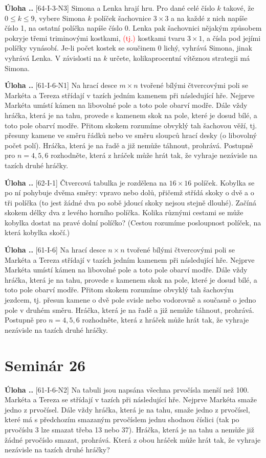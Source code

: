 \documentclass{article}
\newcounter{seminar}
\newcounter{problem}
\newcommand{\seminar}[1]{
  \clearpage
  \setcounter{seminar}{#1}
  \setcounter{problem}{0}
  \section*{Seminár #1}
}
\newcommand\todo[1]{\noindent\textcolor{red}{(#1)}}
\newcommand{\problem}[3]{
  \stepcounter{problem}
  \noindent\textbf{Úloha \theseminar .\theproblem.}
    [#1] #2
  \noindent#3
  \bigskip
}
\begin{document}
\problem{64-I-3-N3}{
Simona a Lenka hrají hru. Pro dané celé číslo $k$ takové, že $0 \leq k \leq 9$, vybere Simona $k$ políček šachovnice $3 \times 3$ a na každé z nich napíše číslo 1, na ostatní políčka napíše číslo 0. Lenka pak šachovnici nějakým způsobem pokryje třemi triminovými kostkami, \todo{tj.} kostkami tvaru $3 \times 1$, a čísla pod jejími políčky vynásobí. Je-li počet kostek se součinem 0 lichý, vyhrává Simona, jinak vyhrává Lenka. V závislosti na $k$ určete, kolikaprocentní vítěznou strategii má Simona.
}{
}

\problem{61-I-6-N1}{
Na hrací desce $m \times n$ tvořené bílými čtvercovými poli se Markéta a Tereza střídají v tazích jedním kamenem při následující hře. Nejprve Markéta umístí kámen na libovolné pole a toto pole obarví modře. Dále vždy hráčka, která je na tahu, provede s kamenem skok na pole, které je dosud bílé, a toto pole obarví modře. Přitom skokem rozumíme obvyklý tah šachovou věží, tj. přesuny kamene ve směru řádků nebo ve směru sloupců hrací desky (o libovolný počet polí). Hráčka, která je na řadě a již nemůže táhnout, prohrává. Postupně pro $n = 4, 5, 6$ rozhodněte, která z hráček může hrát tak, že vyhraje nezávisle na tazích druhé hráčky.
}{
}

\problem{62-I-1}{
Čtvercová tabulka je rozdělena na $16 \times 16$ políček. Kobylka se po ní pohybuje dvěma směry: vpravo nebo dolů, přičemž střídá skoky o dvě a o tři políčka (to jest žádné dva po sobě jdoucí skoky nejsou stejně dlouhé). Začíná skokem délky dva z levého horního políčka. Kolika různými cestami se může kobylka dostat na pravé dolní políčko? (Cestou rozumíme posloupnost políček, na která kobylka skočí.)
}{
}

\problem{61-I-6}{
Na hrací desce $n \times n$ tvořené bílými čtvercovými poli se Markéta a Tereza střídají v tazích jedním kamenem při následující hře. Nejprve Markéta umístí kámen na libovolné pole a toto pole obarví modře. Dále vždy hráčka, která je na tahu, provede s kamenem skok na pole, které je dosud bílé, a toto pole obarví modře. Přitom skokem rozumíme obvyklý tah šachovým jezdcem, tj. přesun kamene o dvě pole svisle nebo vodorovně a současně o jedno pole v druhém směru. Hráčka, která je na řadě a již nemůže táhnout, prohrává. Postupně pro $n = 4, 5, 6$ rozhodněte, která z hráček může hrát tak, že vyhraje nezávisle na tazích druhé hráčky.
}{
}


\seminar{26}

\problem{61-I-6-N2}{
Na tabuli jsou napsána všechna prvočísla menší než 100. Markéta a Tereza se střídají v tazích při následující hře. Nejprve Markéta smaže jedno z prvočísel. Dále vždy hráčka, která je na tahu, smaže jedno z prvočísel, které má s předchozím smazaným prvočíslem jednu shodnou číslici (tak po prvočíslu 3 lze smazat třeba 13 nebo 37). Hráčka, která je na tahu a nemůže již žádné prvočíslo smazat, prohrává. Která z obou hráček může hrát
tak, že vyhraje nezávisle na tazích druhé hráčky?
}{
}
\end{document}
